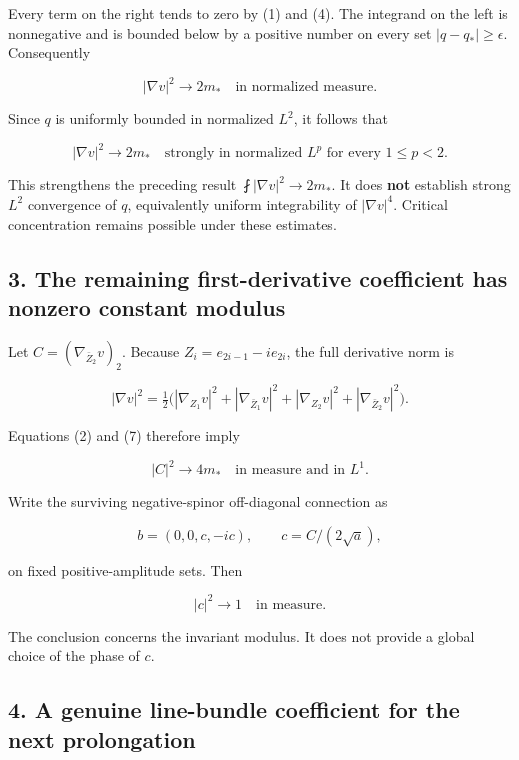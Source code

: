 \documentclass[11pt]{article}
\begin{document}
Every term on the right tends to zero by (1) and (4). The integrand on
the left is nonnegative and is bounded below by a positive number on
every set \(|q-q_*|\ge\epsilon\). Consequently

\[
 \boxed{|\nabla v|^2\longrightarrow2m_*\quad\text{in normalized measure}.}
\tag{C.6}
\]

Since \(q\) is uniformly bounded in normalized \(L^2\), it follows that

\[
 \boxed{|\nabla v|^2\longrightarrow2m_*
       \quad\text{strongly in normalized }L^p\text{ for every }1\le p<2.}
\tag{C.7}
\]

This strengthens the preceding result \(\fint|\nabla v|^2\to2m_*\). It
does \textbf{not} establish strong \(L^2\) convergence of \(q\),
equivalently uniform integrability of \(|\nabla v|^4\). Critical
concentration remains possible under these estimates.

\hypertarget{the-remaining-first-derivative-coefficient-has-nonzero-constant-modulus}{%
\subsection{3. The remaining first-derivative coefficient has nonzero
constant
modulus}\label{the-remaining-first-derivative-coefficient-has-nonzero-constant-modulus}}

Let \(C=(\nabla_{\bar Z_2}v)_2\). Because \(Z_i=e_{2i-1}-ie_{2i}\), the
full derivative norm is

\[
 |\nabla v|^2=\tfrac12\bigl(
 |\nabla_{Z_1}v|^2+|\nabla_{\bar Z_1}v|^2+
 |\nabla_{Z_2}v|^2+|\nabla_{\bar Z_2}v|^2\bigr).
\]

Equations (2) and (7) therefore imply

\[
 \boxed{|C|^2\longrightarrow4m_*\quad\text{in measure and in }L^1.}
\tag{C.8}
\]

Write the surviving negative-spinor off-diagonal connection as

\[
 b=(0,0,c,-ic),\qquad c=C/(2\sqrt a),
\]

on fixed positive-amplitude sets. Then

\[
 \boxed{|c|^2\longrightarrow1\quad\text{in measure}.}
\tag{C.9}
\]

The conclusion concerns the invariant modulus. It does not provide a
global choice of the phase of \(c\).

\hypertarget{a-genuine-line-bundle-coefficient-for-the-next-prolongation}{%
\subsection{4. A genuine line-bundle coefficient for the next
prolongation}\label{a-genuine-line-bundle-coefficient-for-the-next-prolongation}}
\end{document}
